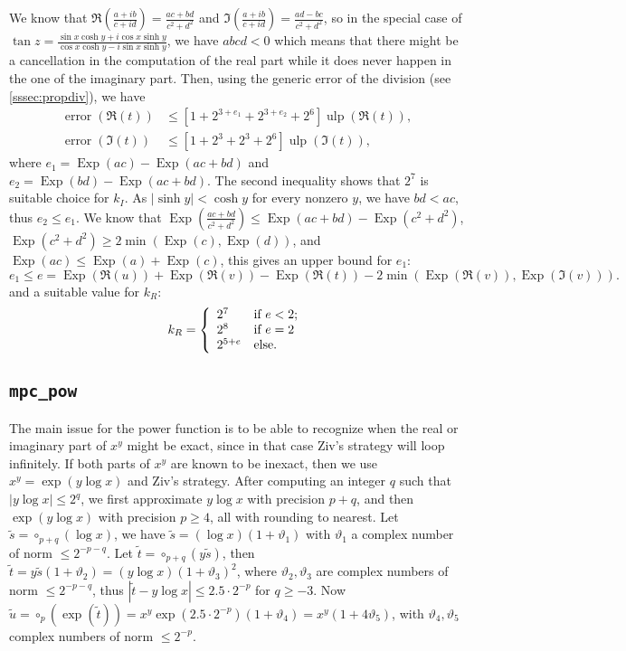 \documentclass {article}
\newcommand {\Ulp}{{\operatorname {ulp}}}
\DeclareMathOperator{\Exp}{\operatorname {Exp}}
\newcommand{\error}{\operatorname {error}}
\newcommand {\round}{\operatorname {\circ}}
\renewcommand {\theta}{\vartheta}
\renewcommand {\leq}{\leqslant}
\renewcommand {\geq}{\geqslant}
\begin{document}
We know that $\Re(\frac{a+i b}{c+i d})=\frac{a c +b d}{c^2 + d^2}$ and
$\Im(\frac{a+i b}{c+i d})=\frac{a d -b c}{c^2 + d^2}$, so in the special case
of $\tan z=\frac{\sin x\cosh y+i\cos x\sinh y}{\cos x\cosh y-i\sin x\sinh y}$,
we have $abcd < 0$ which means that there might be a cancellation in the
computation of the real part while it does never happen in the one of the
imaginary part.  Then, using the generic error of the division (see
\ref{sssec:propdiv}), we have
\begin{align*}
\error(\Re(t)) &\leq [1+2^{3+e_1}+2^{3+e_2}+2^6] \Ulp(\Re(t)),
\\
\error(\Im(t)) &\leq [1+2^3+2^3+2^6] \Ulp(\Im(t)),
\end{align*}
where $e_1=\Exp(a c) -\Exp(a c+b d)$ and $e_2=\Exp(b d) -\Exp(a c+b d)$.  The
second inequality shows that $2^7$ is suitable choice for $k_I$. As $|\sinh
y|<\cosh y$ for every nonzero $y$, we have $bd<ac$, thus $e_2\leq e_1$. We
know that $\Exp(\frac{a c+b d}{c^2+d^2})\leq \Exp(a c+b d) -\Exp(c^2+d^2)$,
$\Exp(c^2+d^2)\geq2 \min(\Exp(c), \Exp(d))$, and $\Exp(ac) \leq \Exp(a) +
\Exp(c)$, this gives an upper bound for $e_1$:
\[
e_1 \leq e = \Exp(\Re(u)) +\Exp(\Re(v)) -\Exp(\Re(t))
-2 \min(\Exp(\Re(v)), \Exp(\Im(v))).
\]
and a suitable value for $k_R$:
\begin{equation*}
k_R=\left\{
\begin{array}{l l}
  2^7 & \mbox{if $e < 2$;}
  \\
  2^8 & \mbox{if $e = 2$}
  \\
  2^{5 + e} & \mbox{else.}
\end{array}
\right.
\end{equation*}

\subsection {\texttt {mpc\_pow}}

The main issue for the power function is to be able to recognize when the
real or imaginary part of $x^y$ might be exact, since in that case
Ziv's strategy will loop infinitely.
If both parts of $x^y$ are known to be inexact, then we use
$x^y = \exp(y \log x)$ and Ziv's strategy.
After computing an integer $q$ such that $|y \log x| \leq 2^q$, we first
approximate $y \log x$ with precision $p + q$, and then
$\exp(y \log x)$ with precision $p \geq 4$, all with rounding
to nearest.
Let $\tilde{s} = \round_{p+q}(\log x)$,
we have $\tilde{s} = (\log x) (1 + \theta_1)$
with $\theta_1$ a complex number of norm $\leq 2^{-p-q}$.
Let $\tilde{t} = \round_{p+q}(y \tilde{s})$, then
$\tilde{t} = y \tilde{s} (1 + \theta_2) = (y \log x) (1 + \theta_3)^2$,
where $\theta_2, \theta_3$ are complex numbers of norm $\leq 2^{-p-q}$,
thus $|\tilde{t} - y \log x| \leq 2.5 \cdot 2^{-p}$ for $q \geq -3$.
Now $\tilde{u} = \round_p(\exp(\tilde{t})) =
x^y \exp(2.5 \cdot 2^{-p}) (1 + \theta_4) = x^y (1 + 4 \theta_5)$,
with $\theta_4, \theta_5$ complex numbers of norm $\leq 2^{-p}$.
\end{document}
